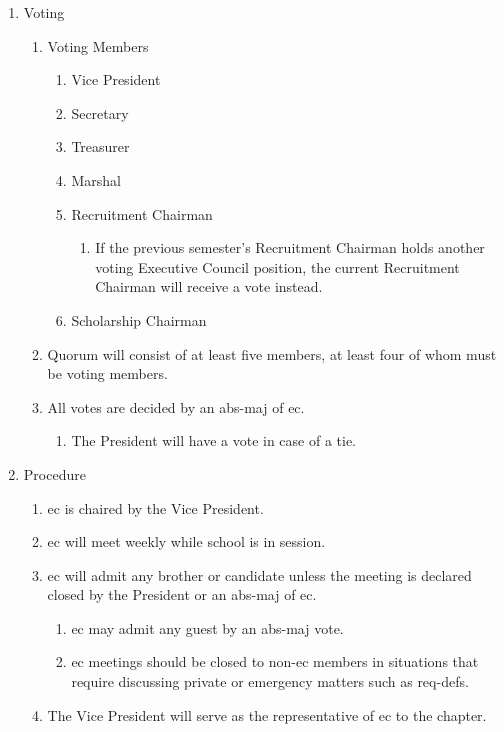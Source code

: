 \begin{enumerate}
		\item Voting
			\begin{enumerate}
				\item Voting Members
					\begin{enumerate}
						\item Vice President
						\item Secretary
						\item Treasurer
						\item Marshal
						\item Recruitment Chairman
							\begin{enumerate}
								\item If the previous semester's Recruitment Chairman holds another voting Executive Council position, the current Recruitment Chairman will receive a vote instead.
							\end{enumerate}
                        \item Scholarship Chairman
					\end{enumerate}
				\item Quorum will consist of at least five members, at least four of whom must be voting members.
				\item All votes are decided by an \gls{abs-maj} of \gls{ec}.
                \begin{enumerate}
                    \item The President will have a vote in case of a tie.
                \end{enumerate}
			\end{enumerate}
		\item Procedure
			\begin{enumerate}
				\item \gls{ec} is chaired by the Vice President.
				\item \gls{ec} will meet weekly while school is in session.
				\item \gls{ec} will admit any brother or candidate unless the meeting is declared closed by the President or an \gls{abs-maj} of \gls{ec}.
					\begin{enumerate}
                        \item \gls{ec} may admit any guest by an \gls{abs-maj} vote.
						\item \gls{ec} meetings should be closed to non-\gls{ec} members in situations that require discussing private or emergency matters such as \glspl{req-def}.
					\end{enumerate}
				\item The Vice President will serve as the representative of \gls{ec} to the chapter.
			\end{enumerate}
	\end{enumerate}

